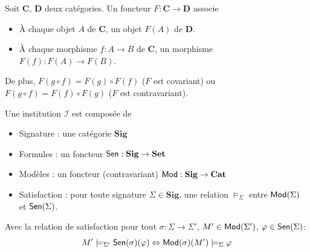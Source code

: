 \documentclass{beamer}
\newcommand{\gr}{\textbf}
\newcommand{\info}[1]{\text{{\fontfamily{lmss}\selectfont #1}}}
\newcommand{\Mod}{\info{Mod}}
\newcommand{\Sen}{\info{Sen}}
\newcommand{\itemz}{\item[$\triangleright$]}
\begin{document}
\begin{frame}[fragile]
\begin{definition}[Foncteur]
Soit $\gr{C}$, $\gr{D}$ deux catégories. Un foncteur $F : \gr{C} \to \gr{D}$ associe 
\begin{itemize}
\item \`A chaque objet $A$ de $\gr{C}$, un objet $F(A)$ de $\gr{D}$.
\item \`A chaque morphisme $f : A \to B$ de $\gr{C}$, un morphisme $F(f) : F(A) \to F(B)$. 
\end{itemize}
De plus, $F(g \circ f) = F(g) \circ F(f)$ ($F$ est covariant) ou $F(g \circ f) = F(f) \circ F(g)$ ($F$ est contravariant). 
\end{definition}
\pause
\begin{center}
\end{center}

\end{frame}

\begin{frame}

\begin{definition}[Institution]
Une institution $\mathcal{I}$ est composée de
\begin{itemize}
\itemz Signature : une catégorie $\textbf{Sig}$
\itemz Formules : un foncteur $\Sen : \textbf{Sig} \to \textbf{Set}$
\itemz Modèles : un foncteur (contravariant) $\Mod : \textbf{Sig} \to \textbf{Cat}$
\itemz Satisfaction : pour toute signature $\Sigma \in \textbf{Sig}$, une relation $\models_\Sigma$ entre $\Mod(\Sigma)$ et $\Sen(\Sigma)$.
\end{itemize}
\end{definition}
Avec la relation de satisfaction pour tout $\sigma : \Sigma \to \Sigma'$, $M' \in \Mod(\Sigma')$, $\varphi \in \Sen(\Sigma)$:
\[ M' \models_{\Sigma'} \Sen(\sigma)(\varphi) \Leftrightarrow \Mod(\sigma)(M') \models_\Sigma \varphi \]
\end{frame}
\end{document}
